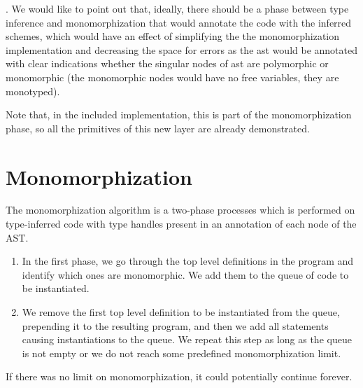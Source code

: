 \begin{defn}
    . We would like to point out that, ideally, there should be a phase between type inference and monomorphization that would annotate the code with the inferred schemes, which would have an effect of simplifying the the monomorphization implementation and decreasing the space for errors as the ast would be annotated with clear indications whether the singular nodes of ast are polymorphic or monomorphic (the monomorphic nodes would have no free variables, they are monotyped).

    Note that, in the included implementation, this is part of the monomorphization phase, so all the primitives of this new layer are already demonstrated.
\end{defn}

\section{Monomorphization}

The monomorphization algorithm is a two-phase processes which is performed on type-inferred code with type handles present in an annotation of each node of the AST.

\begin{enumerate}
    \item In the first phase, we go through the top level definitions in the program and identify which ones are monomorphic. We add them to the queue of code to be instantiated.

    \item We remove the first top level definition to be instantiated from the queue, prepending it to the resulting program, and then we add all statements causing instantiations to the queue. We repeat this step as long as the queue is not empty or we do not reach some predefined monomorphization limit.
\end{enumerate}


If there was no limit on monomorphization, it could potentially continue forever.

